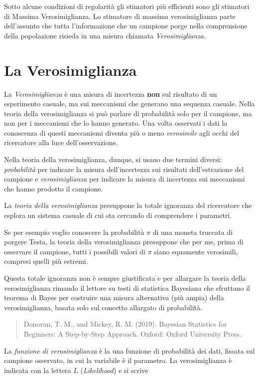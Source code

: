 \documentclass[
  11pt,
]{book}
\theoremstyle{mytheoremstyle}
\theoremstyle{mydefstyle}
\begin{document}
Sotto alcune condizioni di regolarità gli stimatori più efficienti sono gli stimatori di Massima Verosimiglianza.
Lo stimatore di massima verosimiglianza parte dell'assunto che tutta l'informazione che un campione
porge nella comprensione della popolazione risieda in una misura chiamata \emph{Verosimiglianza}.

\section{La Verosimiglianza}\label{la-verosimiglianza}

La \emph{Verosimiglianza} è una misura di incertezza \textbf{non} sul risultato di un
esperimento casuale, ma sui meccanismi che generano una sequenza casuale.
Nella teoria della verosimiglianza si può parlare di probabilità solo per il campione,
ma non per i meccanismi che lo hanno generato. Una volta osservati i dati la conoscenza
di questi meccanismi diventa più o meno \emph{verosimile} agli occhi del ricercatore alla
luce dell'osservazione.

Nella teoria della verosimiglianza, dunque, si usano due termini diversi: \emph{probabilità}
per indicare la misura dell'incertezza sui risultati dell'estrazione del campione e
\emph{verosimiglianza} per indicare la misura di incertezza sui meccanismi che hanno prodotto il
campione.

La \emph{teoria della verosimiglianza} presuppone la totale ignoranza del ricercatore
che esplora un sistema casuale di cui sta cercando di comprendere i parametri.

Se per esempio voglio conoscere la probabilità \(\pi\) di una moneta truccata di
porgere Testa, la teoria della verosimiglianza presuppone che per me,
prima di osservare il campione, tutti i possibili valori di \(\pi\) siano
equamente verosimili, compresi quelli più estremi.

Questa totale ignoranza non è sempre giustificata e per allargare la teoria della
verosimiglianza rimando il lettore su testi di statistica Bayesiana che sfruttano
il teorema di Bayes per costruire una misura alternativa (più ampia) della
verosimiglianza, basata solo sul concetto allargato di probabilità.

\begin{quote}
Donovan, T. M., and Mickey, R. M. (2019). Bayesian Statistics for Beginners: A Step-by-Step Approach. Oxford: Oxford University Press.
\end{quote}

La \emph{funzione di verosimiglianza} è la una funzione di probabilità dei dati,
fissata sul campione osservato, in cui la variabile è il parametro. La verosimiglianza è
indicata con la lettera \(L\) (\emph{Likelihood}) e si scrive
\end{document}
